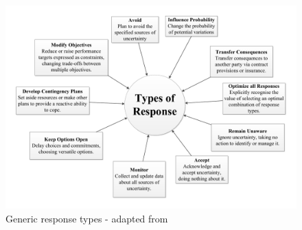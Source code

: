 \begin{figure}[!h]
  \centering
    \includegraphics[width = \textwidth]{./Figures/ResponseTypes.pdf} 
\caption{Generic response types - adapted from \cite{chapman}}
\label{Figure:Identify}
\end{figure}









